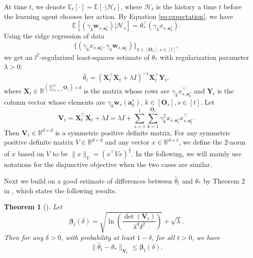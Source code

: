 \documentclass{article}
\newcommand{\bbeta}{\boldsymbol{\beta}}
\newcommand{\EE}{\mathbb{E}}
\newcommand{\RR}{\mathbb{R}}
\newcommand{\ba}{\mathbf{a}}
\newcommand{\bO}{\mathbf{O}}
\newcommand{\bV}{\mathbf{V}}
\newcommand{\bw}{\mathbf{w}}
\newcommand{\bX}{\mathbf{X}}
\newcommand{\bY}{\mathbf{Y}}
\newcommand{\cH}{\mathcal{H}}
\newcommand{\norm}[1]{\| #1 \|}
\newtheorem{theorem}{Theorem}[section]
\newcommand{\wei}[1]{}
\newcommand{\wei}[1]{{\color{blue!50!black}  [\text{Wei:} #1]}}
\begin{document}
At time $t$, we denote $\EE_t[\cdot] = \EE[\cdot | \cH_t]$, where $\cH_t$ is the history a time $t$ before the learning agent
	chooses her action. 
By Equation \eqref{eq:expectation}, we have 
$$
\EE[(\gamma_k \bw_{s,\ba_k^s}) | \cH_{s}] = \theta_*^{\top} (\gamma_k x_{s,\ba_k^s}).
$$
Using the ridge regression of data 
$$
\{(\gamma_k x_{s,\ba_k^s}, \gamma_k \bw_{s,\ba_k^s})\}_{k \in[\bO_s], s\in[t]},
$$
we get an $l^2$-regularized least-squares estimate of $\theta_*$ with regularization parameter $\lambda > 0$:
\begin{equation}
\hat{\theta}_t = (\bX_t^{\top}\bX_t + \lambda I)^{-1} \bX_t^{\top} \bY_t,
\end{equation}
where $\bX_t \in \RR^{(\sum_{s=1}^{t}\bO_s) \times d}$ is the matrix whose rows are $\gamma_k x_{s,\ba_k^s}^{\top}$ and $\bY_t$ is the column vector whose elements are $\gamma_k \bw_s(\ba_k^s)$, $k \in[\bO_s], s\in[t]$. Let
$$
\bV_t = \bX_t^{\top} \bX_t + \lambda I = \lambda I + \sum_{s=1}^{t} \sum_{k=1}^{\bO_s} \gamma_k^2 x_{s,\ba_k^s}x_{s,\ba_k^s}^{\top}.
$$
Then $\bV_t \in \RR^{d \times d}$ is a symmetric positive definite matrix. 
For any symmetric positive definite matrix $V \in \RR^{d \times d} $ and any
	vector $x \in \RR^{d \times 1}$, we define the $2$-norm of $x$ based on
	$V$ to be $\norm{x}_V = (x^{\top} V x)^{\frac{1}{2}}$.
In the following, we will mainly use notations for the disjunctive objective when the two cases are similar.

Next we build on a good estimate of differences between $\hat{\theta}_t$ and $\theta_*$ by Theorem 2 in \cite{abbasi2011improved}, which states the following results.
	
\begin{theorem}[\cite{abbasi2011improved}]
\label{thm:theta_estimate}
Let 
\begin{equation}
\bbeta_{t}(\delta) = \sqrt{\ln\left(\frac{\det(\bV_{t})}{\lambda^d \delta^2}\right)} + \sqrt{\lambda}. \label{eq:definebeta}
\end{equation}
Then for any $\delta > 0$, with probability at least $1 - \delta$, for all $t > 0$, we have
\begin{equation}
\label{eq:estimateTheta}
\norm{\hat{\theta}_t - \theta_{\ast}}_{\bV_{t}} \leq \bbeta_{t}(\delta).
\end{equation}
\end{theorem}
\end{document}
